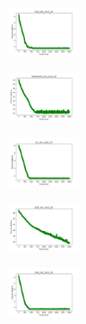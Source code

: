 \begin{figure}[H]
    \begin{subfigure}
        \centering
        \includegraphics[width=0.234\textwidth]{img/aggsf/rand_set_const_20_277451237_cost.png}
    \end{subfigure}
    \hfill
    \begin{subfigure}
        \centering
        \includegraphics[width=0.234\textwidth]{img/aggsf/newthyroid_set_const_20_277451237_cost.png}
    \end{subfigure}
    \hfill
    \begin{subfigure}
        \centering
        \includegraphics[width=0.234\textwidth]{img/aggsf/iris_set_const_20_49258669_cost.png}
    \end{subfigure}
    \hfill
    \begin{subfigure}
        \centering
        \includegraphics[width=0.234\textwidth]{img/aggsf/ecoli_set_const_20_49258669_cost.png}
    \end{subfigure}
    \hfill
    \begin{subfigure}
        \centering
        \includegraphics[width=0.234\textwidth]{img/aggsf/rand_set_const_20_49258669_cost.png}
    \end{subfigure}
    \hfill
    \begin{subfigure}
        \centering

\end{subfigure}
\end{figure}
